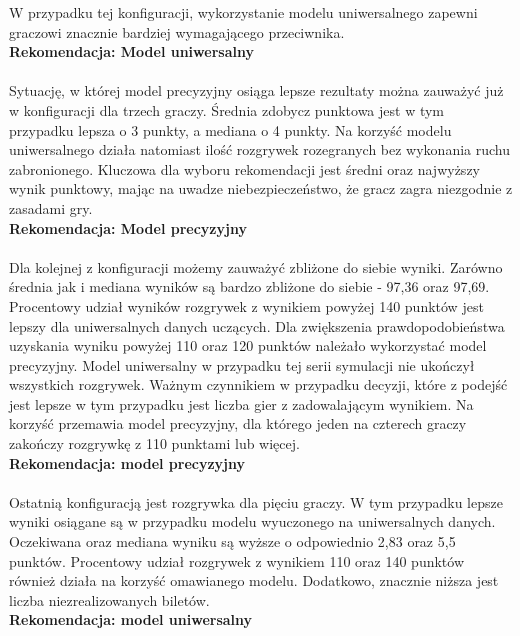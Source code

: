 \documentclass[12pt, oneside]{report}
\begin{document}
W przypadku tej konfiguracji, wykorzystanie modelu uniwersalnego zapewni graczowi znacznie bardziej wymagającego przeciwnika.
\\
\textbf{Rekomendacja: Model uniwersalny} \\ \\ 
Sytuację, w której model precyzyjny osiąga lepsze rezultaty można zauważyć już w konfiguracji dla trzech graczy. Średnia zdobycz punktowa jest w tym przypadku lepsza o 3 punkty, a mediana o 4 punkty. Na korzyść modelu uniwersalnego działa natomiast ilość rozgrywek rozegranych bez wykonania ruchu zabronionego. Kluczowa dla wyboru rekomendacji jest średni oraz najwyższy wynik punktowy, mając na uwadze niebezpieczeństwo, że gracz zagra niezgodnie z zasadami gry.
 \\
\textbf{Rekomendacja: Model precyzyjny} \\ \\
Dla kolejnej z konfiguracji możemy zauważyć zbliżone do siebie wyniki. Zarówno średnia jak i mediana wyników są bardzo zbliżone do siebie - 97,36 oraz 97,69. Procentowy udział wyników rozgrywek z wynikiem powyżej 140 punktów jest lepszy dla uniwersalnych danych uczących. Dla zwiększenia prawdopodobieństwa uzyskania wyniku powyżej 110 oraz 120 punktów należało wykorzystać model precyzyjny. Model uniwersalny w przypadku tej serii symulacji nie ukończył wszystkich rozgrywek. Ważnym czynnikiem w przypadku decyzji, które z podejść jest lepsze w tym przypadku jest liczba gier z zadowalającym wynikiem. Na korzyść przemawia model precyzyjny, dla którego jeden na czterech graczy zakończy rozgrywkę z 110 punktami lub więcej.
\\ \textbf{Rekomendacja: model precyzyjny} \\ \\ 
Ostatnią konfiguracją jest rozgrywka dla pięciu graczy. W tym przypadku lepsze wyniki osiągane są w przypadku modelu wyuczonego na uniwersalnych danych. Oczekiwana oraz mediana wyniku są wyższe o odpowiednio 2,83 oraz 5,5 punktów. Procentowy udział rozgrywek z wynikiem 110 oraz 140 punktów również działa na korzyść omawianego modelu. Dodatkowo, znacznie niższa jest liczba niezrealizowanych biletów. \\ \textbf{Rekomendacja: model uniwersalny} \\ \\
\end{document}
